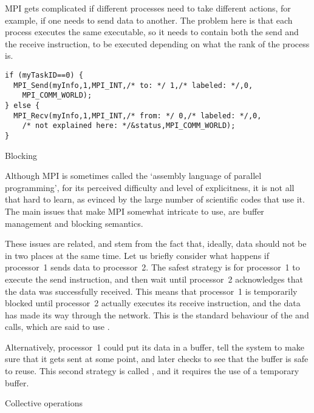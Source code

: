 MPI gets complicated if different processes need to take
different actions, for example, if one needs to send data to
another. The problem here is that each process executes the same
executable, so it needs to contain both the send and the receive
instruction, to be executed depending on what the rank of the process
is.
\begin{verbatim}
if (myTaskID==0) {
  MPI_Send(myInfo,1,MPI_INT,/* to: */ 1,/* labeled: */,0,
    MPI_COMM_WORLD);
} else {
  MPI_Recv(myInfo,1,MPI_INT,/* from: */ 0,/* labeled: */,0,
    /* not explained here: */&status,MPI_COMM_WORLD);
}   
\end{verbatim}

 {Blocking}
\label{sec:blocking}

Although MPI is sometimes called the `assembly language of parallel
programming', for its perceived difficulty and level of explicitness,
it is not all that hard to learn, as evinced by the large number of scientific
codes that use it. The main issues that make MPI somewhat intricate to
use, are buffer management and blocking semantics.

These issues are related, and stem from the fact that, ideally, data
should not be in two places at the same time. Let us briefly
consider what happens if processor~1 sends data to processor~2. The
safest strategy is for processor~1 to execute the send instruction,
and then wait until processor~2 acknowledges that the data was
successfully received. This means that processor~1 is temporarily
blocked until processor~2 actually executes its receive instruction,
and the data has made its way through the network. This is the
standard behaviour of the  and  calls, which
are said to use .

Alternatively,
processor~1 could put its data in a buffer, tell the system to make
sure that it gets sent at some point, and later checks to see that the
buffer is safe to reuse. This second strategy is called
, and it requires the use
of a temporary buffer.

 {Collective operations}
\label{sec:mpi-collective}

